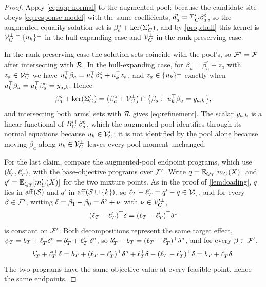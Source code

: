 \begin{proof}
Apply \eqref{eq:app-normal} to the augmented pool: because the candidate
site obeys \eqref{eq:response-model} with the same coefficients,
$d_{a}'=\Sigma_C'\beta^\circ_a$, so the augmented equality solution set
is $\beta^\circ_a+\operatorname{ker}(\Sigma_C')$, and by \cref{prop:hull} this kernel
is $\mathcal V_C^\perp\cap\{u_{k}\}^\perp$ in the hull-expanding case and
$\mathcal V_C^\perp$ in the rank-preserving case.

In the rank-preserving case the solution sets coincide with the pool's,
so $\mathcal F'=\mathcal F$ after intersecting with $\mathcal R$. In the
hull-expanding case, for $\beta_a=\beta^\circ_a+z_a$ with
$z_a\in\mathcal V_C^\perp$ we have
$u_{k}^\top\beta_a=u_{k}^\top\beta^\circ_a
+u_{k}^\top z_a$, and $z_a\in\{u_{k}\}^\perp$ exactly when
$u_{k}^\top\beta_a=u_{k}^\top\beta^\circ_a=y_{a,k}$.
Hence
\[
  \beta^\circ_a+\kernel(\CovC')
  =\bigl(\beta^\circ_a+\Vspan^\perp\bigr)
  \cap\bigl\{\beta_a:\ \newdir{k}^\top\beta_a=\reveal{a}{k}\bigr\},
\]
and intersecting both arms' sets with $\mathcal R$ gives
\eqref{eq:refinement}. The scalar $y_{a,k}$ is a linear functional
of $B_C'^\top\beta^\circ_a$, which the augmented pool identifies
through its normal equations because $u_{k}\in\mathcal V_C'$; it is not
identified by the pool alone because moving $\beta_a$ along
$u_{k}\in\mathcal V_C^\perp$ leaves every pool moment unchanged.

For the last claim, compare the augmented-pool endpoint programs, which
use $(b_T',\ell_T')$, with the base-objective programs over
$\mathcal F'$. Write $q=\mathbb{E}_{Q_T}[m_C(X)]$ and $q'=\mathbb{E}_{Q_T}[m_C'(X)]$ for
the two mixture points. As in the proof of \cref{lem:loading}, $q$ lies
in $\operatorname{aff}(\mathcal S)$ and $q'$ in $\operatorname{aff}(\mathcal S\cup\{k\})$, so
$\ell_T-\ell_T'=q'-q\in\mathcal V_C'$, and for every $\beta\in\mathcal F'$,
writing $\delta=\beta_1-\beta_0=\delta^\circ+\nu$ with
$\nu\in\mathcal V_C'^\perp$,
\[
  (\ell_T-\ell_T')^\top\delta
  =(\ell_T-\ell_T')^\top\delta^\circ
\]
is constant on $\mathcal F'$. Both decompositions represent the same
target effect, $\psi_T=b_T+\ell_T^\top\delta^\circ
=b_T'+\ell_T'^\top\delta^\circ$, so
$b_T'-b_T=(\ell_T-\ell_T')^\top\delta^\circ$, and for every
$\beta\in\mathcal F'$,
\[
  b_T'+\ell_T'^\top\delta
  =b_T+(\ell_T-\ell_T')^\top\delta^\circ
  +\ell_T^\top\delta-(\ell_T-\ell_T')^\top\delta
  =b_T+\ell_T^\top\delta .
\]
The two programs have the same objective value at every feasible point,
hence the same endpoints.
\end{proof}

